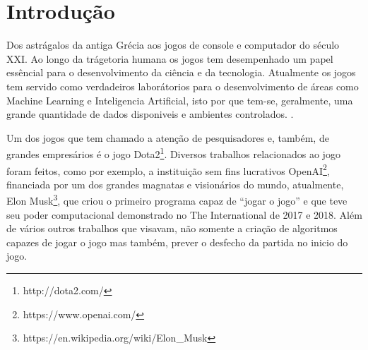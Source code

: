 \documentclass[
12pt,				%
openright,			%
oneside,			%
a4paper,			%
english,			%
brazil,				%
]{abntex2}
\begin{document}

\imprimirfolhaderosto

\tableofcontents*
\cleardoublepage


\textual

\chapter{Introdução}
\label{cha:introducao}



Dos astrágalos da antiga Grécia aos jogos de console e computador do século XXI.
Ao longo da trágetoria humana os jogos tem desempenhado um papel essêncial para
o desenvolvimento da ciência e da tecnologia. Atualmente os jogos tem servido
como verdadeiros laborátorios para o desenvolvimento de áreas como Machine
Learning e Inteligencia Artificial, isto por que tem-se, geralmente, uma grande
quantidade de dados disponiveis e ambientes controlados.
\cite{silva2017moba}.

Um dos jogos que tem chamado a atenção de pesquisadores e, também, de
grandes empresários é o jogo Dota2\footnote{http://dota2.com/}. Diversos
trabalhos relacionados ao jogo foram feitos, como por exemplo, a instituição sem
fins lucrativos OpenAI\footnote{https://www.openai.com/}, financiada por um dos
grandes magnatas e visionários do mundo, atualmente,  Elon
Musk\footnote{https://en.wikipedia.org/wiki/Elon\_Musk}, que criou o primeiro programa capaz de
``jogar o jogo'' e que teve seu poder computacional demonstrado no The International de 2017 e 2018.
Além de vários outros trabalhos que visavam, não somente a criação de algoritmos capazes de jogar o
jogo mas também, prever o desfecho da partida no inicio do jogo.

\end{document}
